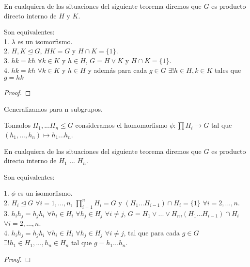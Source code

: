 En cualquiera de las situaciones del siguiente teorema diremos que $G$ es producto directo interno de $H$ y $K$.

\begin{theorem}
Son equivalentes:\\
1. $\lambda$ es un isomorfismo.\\
2. $H,K \trianglelefteq G$, $HK = G$ y $H \cap K = \{1\}$.\\
3. $hk = kh$ $\forall k \in K$ y $h \in H$, $G = H \lor K$ y $H \cap K = \{1\}$.\\
4. $hk = kh$ $\forall k \in K$ y $h \in H$ y además para cada $g \in G$ $\exists  ! h \in H, k \in K$ tales que $g = hk$
\end{theorem}
\begin{proof}

\end{proof}

Generalizamos para n subgrupos.

Tomados $H_1,...H_n \le G$ consideramos el homomorfismo $\phi:\prod H_i \rightarrow G$ tal que $(h_1,...,h_n) \mapsto h_1...h_n$.

En cualquiera de las situaciones del siguiente teorema diremos que $G$ es producto directo interno de $H_1$ ... $H_n$.

\begin{theorem}
Son equivalentes:

1. $\phi$ es un isomorfismo.\\
2. $H_i \trianglelefteq G$ $\forall i = 1,...,n$, $\prod_{i=1}^{n} H_i = G$ y $(H_1...H_{i-1}) \cap H_i = \{1\}$ $\forall i = 2,...,n$.\\
3. $h_i h_j = h_j h_i$ $\forall h_i \in H_i$ $\forall h_j \in H_j$ $\forall i \neq j$, $G = H_1 \lor ... \lor H_n$,$(H_1...H_{i-1})\cap H_i$ $\forall i=2,...,n$.\\
4. $h_ih_j = h_jh_i$ $\forall h_i \in H_i$ $\forall h_j \in H_j$ $\forall i \neq j$, tal que para cada $g \in G$ $\exists ! h_1 \in H_1,...,h_n \in H_n$ tal que $g = h_1...h_n$.
\end{theorem}
\begin{proof}

\end{proof}